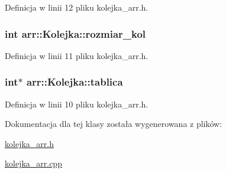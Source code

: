 Definicja w linii 12 pliku kolejka\-\_\-arr.\-h.

\hypertarget{classarr_1_1_kolejka_adbfdaca50c2b0bbe75d9b1e572f9b320}{
\subsubsection[{rozmiar\-\_\-kol}]{\setlength{\rightskip}{0pt plus 5cm}int arr\-::\-Kolejka\-::rozmiar\-\_\-kol\hspace{0.3cm}{\ttfamily [private]}}}\label{classarr_1_1_kolejka_adbfdaca50c2b0bbe75d9b1e572f9b320}


Definicja w linii 11 pliku kolejka\-\_\-arr.\-h.

\hypertarget{classarr_1_1_kolejka_a80a504c56893e43ae1b407b971b501a7}{
\subsubsection[{tablica}]{\setlength{\rightskip}{0pt plus 5cm}int$\ast$ arr\-::\-Kolejka\-::tablica\hspace{0.3cm}{\ttfamily [private]}}}\label{classarr_1_1_kolejka_a80a504c56893e43ae1b407b971b501a7}


Definicja w linii 10 pliku kolejka\-\_\-arr.\-h.



Dokumentacja dla tej klasy została wygenerowana z plików\-:\begin{DoxyCompactItemize}
\item 
\hyperlink{kolejka__arr_8h}{kolejka\-\_\-arr.\-h}\item 
\hyperlink{kolejka__arr_8cpp}{kolejka\-\_\-arr.\-cpp}\end{DoxyCompactItemize}

